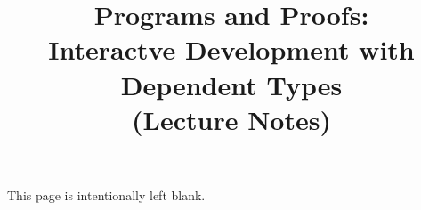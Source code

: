 \documentclass[12pt]{report}
\title{Programs and Proofs:\\
Interactve Development with Dependent Types 
\\
(Lecture Notes)
}
\author{}
\begin{document}
\maketitle

\thispagestyle{empty}
\mbox{}\vfill

\begin{center}

This page is intentionally left blank.

\end{center}


\tableofcontents







\clearpage

% 
% 

\end{document}
